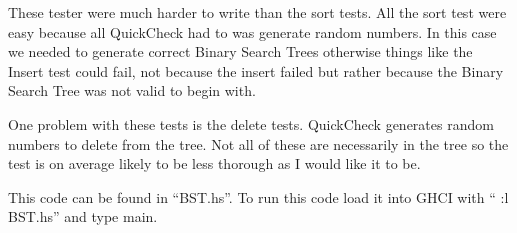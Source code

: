 \documentclass[titlepage]{article}
\begin{document}
These tester were much harder to write than the sort tests. All the sort test 
were easy because all QuickCheck had to was generate random numbers. In this case 
we needed to generate correct Binary Search Trees otherwise things like the 
Insert test could fail, not because the insert failed but rather because the 
Binary Search Tree was not valid to begin with.

One problem with these tests is the delete tests. QuickCheck generates random 
numbers to delete from the tree. Not all of these are necessarily in the tree so 
the test is on average likely to be less thorough as I would like it to be.  

This code can be found in ``BST.hs''. To run this code load it into GHCI with ``
:l BST.hs'' and type main.
\end{document}
